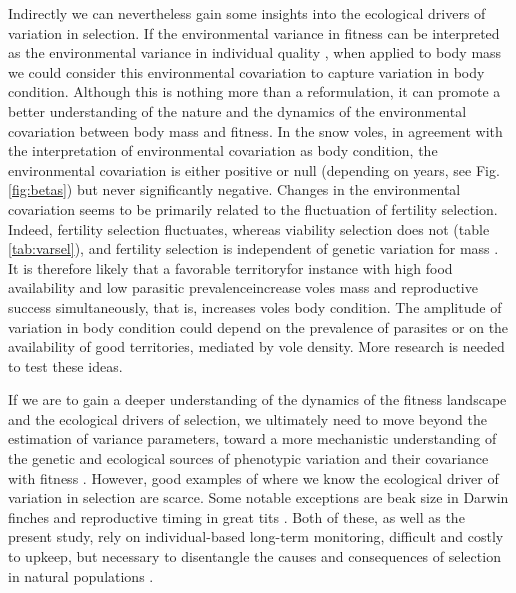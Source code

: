 Indirectly we can nevertheless gain some insights into the ecological drivers of variation in selection. If the environmental variance in fitness can be interpreted as the environmental variance in individual quality \parencite[see][for a discussion of individual quality in an evolutionary context]{Wilson2010a}, when applied to body mass we could consider this environmental covariation to capture variation in body condition. Although this is nothing more than a reformulation, it can promote a better understanding of the nature and the dynamics of the environmental covariation between body mass and fitness. In the snow voles, in agreement with the interpretation of environmental covariation as body condition, the environmental covariation is either positive or null (depending on years, see Fig. \ref{fig:betas}) but never significantly negative.
Changes in the environmental covariation seems to be primarily related to the fluctuation of fertility selection. Indeed, fertility selection fluctuates, whereas viability selection does not (table \ref{tab:varsel}), and fertility selection is independent of genetic variation for mass \parencite{Bonnet2016}.
It is therefore likely that a favorable territory\textemdash for instance with high food availability and low parasitic prevalence\textemdash increase voles mass and reproductive success simultaneously, that is, increases voles body condition. The amplitude of variation in body condition could depend on the prevalence of parasites or on the availability of good territories, mediated by vole density. More research is needed to test these ideas.

If we are to gain a deeper understanding of the dynamics of the fitness landscape and the ecological drivers of selection, we ultimately need to move beyond the estimation of variance parameters, toward a more mechanistic understanding of the genetic and ecological sources of phenotypic variation and their covariance with fitness \parencite{Morrissey2012flusel}. However, good examples of where we know the ecological driver of variation in selection are scarce. Some notable exceptions are beak size in Darwin finches \parencite{Grant2002} and reproductive timing in great tits \parencite{Husby2011}. Both of these, as well as the present study, rely on individual-based long-term monitoring, difficult and costly to upkeep, but necessary to disentangle the causes and consequences of selection in natural populations \parencite{Clutton-brock2010}. 

